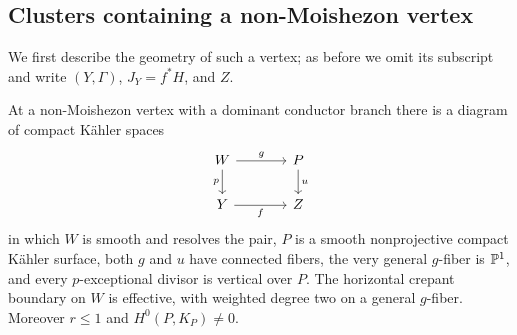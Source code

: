 \subsection{Clusters containing a non-Moishezon vertex}

We first describe the geometry of such a vertex; as before we omit
its subscript and write $(Y,\Gamma)$, $J_Y=f^*H$, and $Z$.

\begin{lemma}
\label{floor:quotient-surface}
At a non-Moishezon vertex with a dominant conductor branch there is
a diagram of compact K\"ahler spaces
\begin{equation}
 \label{floor:quotient-diagram}
 \begin{tikzcd}[column sep=large]
 W \arrow[r,"g"] \arrow[d,"p"'] & P \arrow[d,"u"]\\
 Y \arrow[r,"f"'] & Z
 \end{tikzcd}
\end{equation}
in which $W$ is smooth and resolves the pair, $P$ is a smooth
nonprojective compact K\"ahler surface, both $g$ and $u$ have
connected fibers, the very general $g$-fiber is $\mathbb{P}^1$, and every
$p$-exceptional divisor is vertical over $P$.  The horizontal
crepant boundary on $W$ is effective, with weighted degree two on
a general $g$-fiber.  Moreover $r\le1$ and
$H^0(P,K_P)\ne0$.
\end{lemma}

